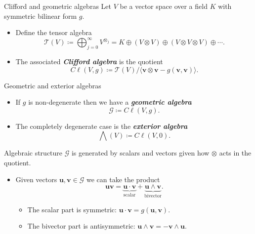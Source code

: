 \documentclass[aspectratio=169]{beamer}
\newcommand\boldgreen[1]{\textcolor{lighter_csu_green}{\emph{\textbf{#1}}}}
\newcommand{\G}{\mathcal{G}}
\newcommand{\blade}[1]{\boldsymbol{#1}}
\begin{document}
\begin{frame}{Clifford and geometric algebras}
\vfill
\pause
Let $V$ be a vector space over a field $K$ with symmetric bilinear form $g$.
\begin{itemize}
        \pause
        \item Define the tensor algebra
        \[
        \mathcal{T}(V) \coloneqq \bigoplus_{j=0}^\infty V^{\otimes_j} = K \oplus (V \otimes V) \oplus (V \otimes V \otimes V) \oplus \cdots.
        \]
        \pause
        \item The associated \boldgreen{Clifford algebra} is the quotient
        \[
        C\ell(V,g) \coloneqq \mathcal{T}(V)/ \langle \blade{v} \otimes \blade{v} - g(\blade{v},\blade{v})\rangle.
        \]
\end{itemize}
\vfill
\end{frame}

\begin{frame}{Geometric and exterior algebras}
\vfill
\begin{itemize}
        \pause
        \item If $g$ is non-degenerate then we have a \boldgreen{geometric algebra}
        \[
        \G \coloneqq C\ell(V,g).
        \]
        \pause
        \item The completely degenerate case is the \boldgreen{exterior algebra}
        \[
        \bigwedge(V) \coloneqq C\ell(V,0).
        \]
\end{itemize}
\vfill
\end{frame}

\begin{frame}{Algebraic structure}
\vfill
\pause
$\G$ is generated by scalars and vectors given how $\otimes$ acts in the quotient.
\begin{itemize}
    \pause
    \item Given vectors $\blade{u}, \blade{v} \in \G$ we can take the product
    \[
    \blade{u}\blade{v} = \underbrace{\blade{u}\cdot \blade{v}}_{\textrm{scalar}} + \underbrace{\blade{u}\wedge \blade{v}}_{\textrm{bivector}}.
    \]
\begin{itemize}
    \pause
    \item The scalar part is symmetric: $\blade{u}\cdot \blade{v} = g(\blade{u},\blade{v})$.
    \pause
    \item The bivector part is antisymmetric: $\blade{u}\wedge \blade{v} = -\blade{v}\wedge \blade{u}$.
\end{itemize}
\end{itemize}
\vfill
\end{frame}
\end{document}
